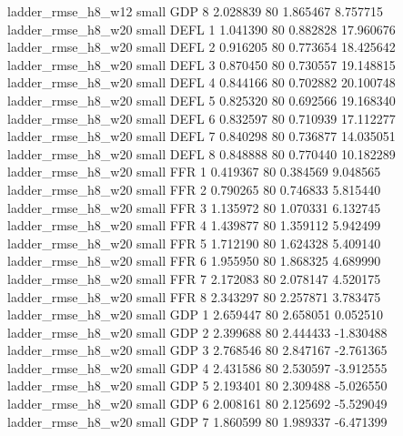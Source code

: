       ladder_rmse_h8_w12      small      GDP                 8 2.028839 80       1.865467           8.757715
      ladder_rmse_h8_w20      small     DEFL                 1 1.041390 80       0.882828          17.960676
      ladder_rmse_h8_w20      small     DEFL                 2 0.916205 80       0.773654          18.425642
      ladder_rmse_h8_w20      small     DEFL                 3 0.870450 80       0.730557          19.148815
      ladder_rmse_h8_w20      small     DEFL                 4 0.844166 80       0.702882          20.100748
      ladder_rmse_h8_w20      small     DEFL                 5 0.825320 80       0.692566          19.168340
      ladder_rmse_h8_w20      small     DEFL                 6 0.832597 80       0.710939          17.112277
      ladder_rmse_h8_w20      small     DEFL                 7 0.840298 80       0.736877          14.035051
      ladder_rmse_h8_w20      small     DEFL                 8 0.848888 80       0.770440          10.182289
      ladder_rmse_h8_w20      small      FFR                 1 0.419367 80       0.384569           9.048565
      ladder_rmse_h8_w20      small      FFR                 2 0.790265 80       0.746833           5.815440
      ladder_rmse_h8_w20      small      FFR                 3 1.135972 80       1.070331           6.132745
      ladder_rmse_h8_w20      small      FFR                 4 1.439877 80       1.359112           5.942499
      ladder_rmse_h8_w20      small      FFR                 5 1.712190 80       1.624328           5.409140
      ladder_rmse_h8_w20      small      FFR                 6 1.955950 80       1.868325           4.689990
      ladder_rmse_h8_w20      small      FFR                 7 2.172083 80       2.078147           4.520175
      ladder_rmse_h8_w20      small      FFR                 8 2.343297 80       2.257871           3.783475
      ladder_rmse_h8_w20      small      GDP                 1 2.659447 80       2.658051           0.052510
      ladder_rmse_h8_w20      small      GDP                 2 2.399688 80       2.444433          -1.830488
      ladder_rmse_h8_w20      small      GDP                 3 2.768546 80       2.847167          -2.761365
      ladder_rmse_h8_w20      small      GDP                 4 2.431586 80       2.530597          -3.912555
      ladder_rmse_h8_w20      small      GDP                 5 2.193401 80       2.309488          -5.026550
      ladder_rmse_h8_w20      small      GDP                 6 2.008161 80       2.125692          -5.529049
      ladder_rmse_h8_w20      small      GDP                 7 1.860599 80       1.989337          -6.471399
